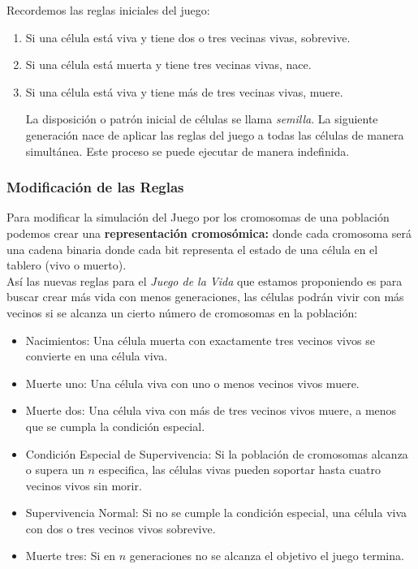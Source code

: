 Recordemos las reglas iniciales del juego:
\begin{enumerate}
    \item Si una célula está viva y tiene dos o tres vecinas vivas, sobrevive.
    \item Si una célula está muerta y tiene tres vecinas vivas, nace.
    \item Si una célula está viva y tiene más de tres vecinas vivas, muere.
    
    La disposición o patrón inicial de células se llama \textit{semilla}. La siguiente 
    generación nace de aplicar las reglas del juego a todas las células de manera 
    simultánea. Este proceso se puede ejecutar de manera indefinida.
\end{enumerate}

\subsubsection*{Modificación de las Reglas}

Para modificar la simulación del Juego por los cromosomas de una población podemos crear
una \textbf{representación cromosómica:} donde cada cromosoma será una cadena binaria 
donde cada bit representa el estado de una célula en el tablero (vivo o muerto).\\ 

Así las nuevas reglas para el \textit{Juego de la Vida} que estamos proponiendo es para 
buscar crear más vida con menos generaciones, las células  podrán vivir con más vecinos 
si se alcanza un cierto número de cromosomas en la población:

\begin{itemize}
    \item Nacimientos: Una célula muerta con exactamente tres vecinos vivos se convierte 
    en una célula viva.
    \item Muerte uno: Una célula viva con uno o menos vecinos vivos muere.
    \item Muerte dos: Una célula viva con más de tres vecinos vivos muere, a menos que se 
    cumpla la condición especial.
    \item Condición Especial de Supervivencia: Si la población de cromosomas alcanza o 
    supera un $n$ especifica, las células vivas pueden soportar hasta cuatro 
    vecinos vivos sin morir.
    \item Supervivencia Normal: Si no se cumple la condición especial, una célula viva con 
    dos o tres vecinos vivos sobrevive.
    \item Muerte tres: Si en $n$ generaciones no se alcanza el objetivo el juego termina.
\end{itemize}

